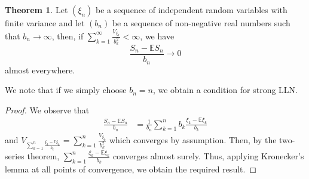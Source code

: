 \documentclass[]{article}
\theoremstyle{definition}
\newtheorem{theorem}{Theorem}
\theoremstyle{definition}
\begin{document}
\begin{theorem}
  Let \((\xi_n)\) be a sequence of independent random variables with finite 
  variance and let \((b_n)\) be a sequence of non-negative real numbers such that 
  \(b_n \to \infty\), then, if \(\sum_{k = 1}^\infty \frac{V_{\xi_k}}{b_k^2} < \infty\),
  we have 
  \[\frac{S_n - \mathbb{E}S_n}{b_n} \to 0\]
  almost everywhere.
  
  We note that if we simply choose \(b_n = n\), we obtain a condition for 
  strong LLN.
\end{theorem}
\begin{proof}
  We observe that 
  \[\begin{split}
    \frac{S_n - \mathbb{E}S_n}{b_n} & = 
    \frac{1}{b_n} \sum_{k = 1}^n b_k \frac{\xi_k - \mathbb{E}\xi_k}{b_k}
  \end{split}\]
  and \(V_{\sum_{k = 1}^n \frac{\xi_k - \mathbb{E}\xi_k}{b_k}} = \sum_{k = 1}^n \frac{V_{\xi_k}}{b_k^2}\)
  which converges by assumption. Then, by the two-series theorem, 
  \(\sum_{k = 1}^n \frac{\xi_k - \mathbb{E}\xi_k}{b_k}\) converges 
  almost surely. Thus, applying Kronecker's lemma at all points of convergence, 
  we obtain the required result.
\end{proof}
\end{document}
